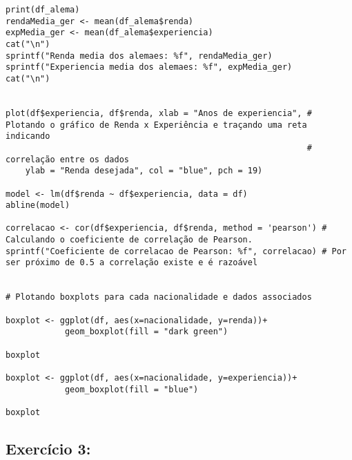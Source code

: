 \documentclass[a4paper,11pt]{article}
\begin{document}
\begin{lstlisting}
print(df_alema)
rendaMedia_ger <- mean(df_alema$renda)
expMedia_ger <- mean(df_alema$experiencia)
cat("\n")
sprintf("Renda media dos alemaes: %f", rendaMedia_ger)
sprintf("Experiencia media dos alemaes: %f", expMedia_ger)
cat("\n")


plot(df$experiencia, df$renda, xlab = "Anos de experiencia", # Plotando o gráfico de Renda x Experiência e traçando uma reta indicando
                                                             # correlação entre os dados
    ylab = "Renda desejada", col = "blue", pch = 19)

model <- lm(df$renda ~ df$experiencia, data = df)
abline(model)

correlacao <- cor(df$experiencia, df$renda, method = 'pearson') # Calculando o coeficiente de correlação de Pearson.
sprintf("Coeficiente de correlacao de Pearson: %f", correlacao) # Por ser próximo de 0.5 a correlação existe e é razoável


# Plotando boxplots para cada nacionalidade e dados associados

boxplot <- ggplot(df, aes(x=nacionalidade, y=renda))+
            geom_boxplot(fill = "dark green")

boxplot

boxplot <- ggplot(df, aes(x=nacionalidade, y=experiencia))+
            geom_boxplot(fill = "blue")

boxplot
\end{lstlisting}

\subsection{Exercício 3:}
\end{document}

